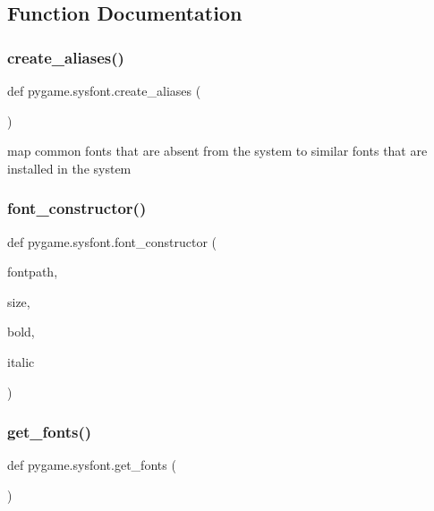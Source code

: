 \subsection{Function Documentation}
\mbox{\label{namespacepygame_1_1sysfont_a29cee381545a4eb1dec4c7b564fba4b1}} 
\subsubsection{\texorpdfstring{create\+\_\+aliases()}{create\_aliases()}}
{\footnotesize\ttfamily def pygame.\+sysfont.\+create\+\_\+aliases (\begin{DoxyParamCaption}{ }\end{DoxyParamCaption})}

\begin{DoxyVerb}map common fonts that are absent from the system to similar fonts that are installed in the system\end{DoxyVerb}
 \mbox{\label{namespacepygame_1_1sysfont_ac9170eb4a3d4e87d83a916340f278c1e}} 
\subsubsection{\texorpdfstring{font\+\_\+constructor()}{font\_constructor()}}
{\footnotesize\ttfamily def pygame.\+sysfont.\+font\+\_\+constructor (\begin{DoxyParamCaption}\item[{}]{fontpath,  }\item[{}]{size,  }\item[{}]{bold,  }\item[{}]{italic }\end{DoxyParamCaption})}

\mbox{\label{namespacepygame_1_1sysfont_acf15c88c489eeec73f822f05208aebf7}} 
\subsubsection{\texorpdfstring{get\+\_\+fonts()}{get\_fonts()}}
{\footnotesize\ttfamily def pygame.\+sysfont.\+get\+\_\+fonts (\begin{DoxyParamCaption}{ }\end{DoxyParamCaption})}

